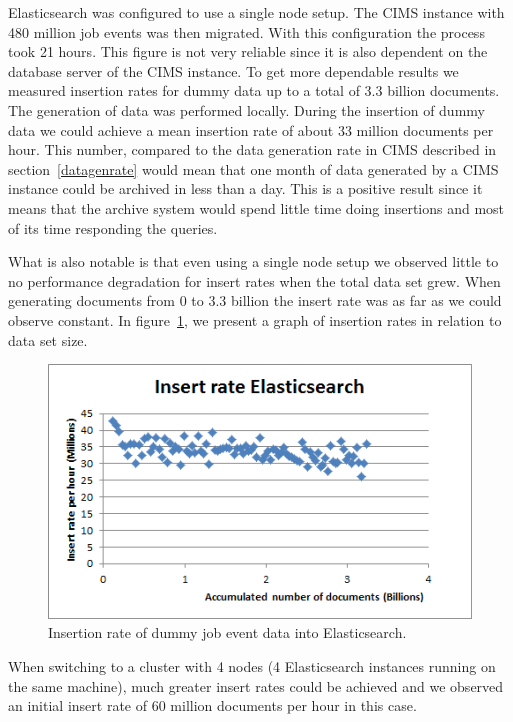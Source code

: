 Elasticsearch was configured to use a single node setup. The CIMS instance with 480 million job events was then migrated. With this configuration the process took 21 hours. This figure is not very reliable since it is also dependent on the database server of the CIMS instance. To get more dependable results we measured insertion rates for dummy data up to a total of 3.3 billion documents. The generation of data was performed locally. During the insertion of dummy data we could achieve a mean insertion rate of about 33 million documents per hour. This number, compared to the data generation rate in CIMS described in section~\ref{datagenrate} would mean that one month of data generated by a CIMS instance could be archived in less than a day. This is a positive result since it means that the archive system would spend little time doing insertions and most of its time responding the queries.

What is also notable is that even using a single node setup we observed little to no performance degradation for insert rates when the total data set grew. When generating documents from 0 to 3.3 billion the insert rate was as far as we could observe constant. In figure~\ref{fig:insert_rate}, we present a graph of insertion rates in relation to data set size.

\begin{figure}[h!]
\centering
\includegraphics[]{figure/insert_rate_es.png}
\caption{Insertion rate of dummy job event data into Elasticsearch.}
\label{fig:insert_rate}
\end{figure}

When switching to a cluster with 4 nodes (4 Elasticsearch instances running on the same machine), much greater insert rates could be achieved and we observed an initial insert rate of 60 million documents per hour in this case.

